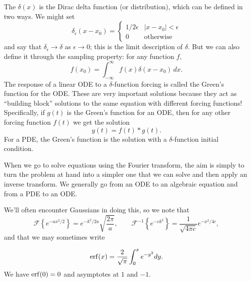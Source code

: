 \documentclass[../m180main.tex]{subfiles}
\begin{document}
The $\delta(x)$ is the Dirac delta function (or distribution), which can be defined in two ways.
We might set
\[ \delta_\epsilon(x - x_0) = \begin{cases} 1 / 2\epsilon & |x - x_0| < \epsilon \\ 0 & \textrm{otherwise} \end{cases} \]
and say that $\delta_\epsilon \to \delta$ as $\epsilon \to 0$; this is the limit description of $\delta$.
But we can also define it through the sampling property: for any function $f$,
\[ f(x_0) = \int_{-\infty}^{\infty} f(x) \delta(x - x_0) \,dx. \]
The response of a linear ODE to a $\delta$-function forcing is called the Green's function for the ODE.
These are very important solutions because they act as ``building block'' solutions to the same equation with different forcing functions!
Specifically, if $g(t)$ is the Green's function for an ODE, then for any other forcing function $f(t)$ we get the solution
\[ y(t) = f(t) * g(t). \]
For a PDE, the Green's function is the solution with a $\delta$-function initial condition.

When we go to solve equations using the Fourier transform, the aim is simply to turn the problem at hand into a simpler one that we can solve and then apply an inverse transform.
We generally go from an ODE to an algebraic equation and from a PDE to an ODE.

We'll often encounter Gaussians in doing this, so we note that
\[ \mathcal F \left\{ e^{-ax^2 / 2} \right\} = e^{-k^2 / 2a} \sqrt{\frac{2\pi}{a}}, \qquad \mathcal F^{-1} \left\{ e^{-ck^2} \right\} = \frac{1}{\sqrt{4\pi c}} e^{-x^2 / 4c}, \]
and that we may sometimes write

\[ \operatorname{erf}(x) = \frac{2}{\sqrt{\pi}} \int_{0}^{x} e^{-y^2} dy. \]
We have $\operatorname{erf}(0) = 0$ and asymptotes at $1$ and $-1$.
\end{document}
